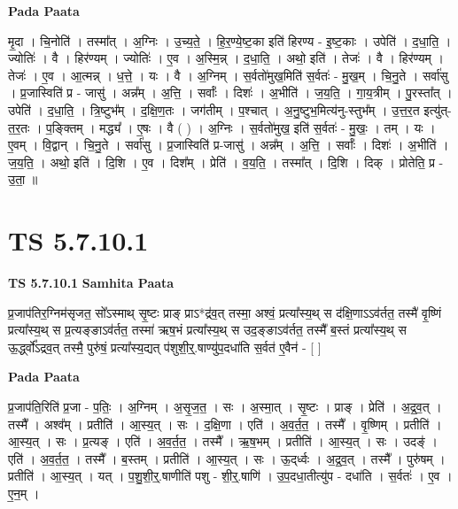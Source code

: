 \documentclass[17pt]{extarticle}
\begin{document}
\textbf{Pada Paata} \newline

मृ॒दा । चि॒नोति॑ । तस्मा᳚त् । अ॒ग्निः । उ॒च्य॒ते॒ । हि॒र॒ण्ये॒ष्ट॒का इति॑ हिरण्य - इ॒ष्ट॒काः । उपेति॑ । द॒धा॒ति॒ । ज्योतिः॑ । वै । हिर॑ण्यम् । ज्योतिः॑ । ए॒व । अ॒स्मि॒न्न् । द॒धा॒ति॒ । अथो॒ इति॑ । तेजः॑ । वै । हिर॑ण्यम् । तेजः॑ । ए॒व । आ॒त्मन्न् । ध॒त्ते॒ । यः । वै । अ॒ग्निम् । स॒र्वतो॑मुख॒मिति॑ स॒र्वतः॑ - मु॒ख॒म् । चि॒नु॒ते । सर्वा॑सु । प्र॒जास्विति॑ प्र - जासु॑ । अन्न᳚म् । अ॒त्ति॒ । सर्वाः᳚ । दिशः॑ । अ॒भीति॑ । ज॒य॒ति॒ । गा॒य॒त्रीम् । पु॒रस्ता᳚त् । उपेति॑ । द॒धा॒ति॒ । त्रि॒ष्टुभ᳚म् । द॒क्षि॒ण॒तः । जग॑तीम् । प॒श्चात् । अ॒नु॒ष्टुभ॒मित्य॑नु-स्तुभ᳚म् । उ॒त्त॒र॒त इत्यु॑त्-त॒र॒तः । प॒ङ्क्तिम् । मद्ध्य᳚ । ए॒षः । वै ( ) । अ॒ग्निः । स॒र्वतो॑मुख॒ इति॑ स॒र्वतः॑ - मु॒खः॒ । तम् । यः । ए॒वम् । वि॒द्वान् । चि॒नु॒ते । सर्वा॑सु । प्र॒जास्विति॑ प्र-जासु॑ । अन्न᳚म् । अ॒त्ति॒ । सर्वाः᳚ । दिशः॑ । अ॒भीति॑ । ज॒य॒ति॒ । अथो॒ इति॑ । दि॒शि । ए॒व । दिश᳚म् । प्रेति॑ । व॒य॒ति॒ । तस्मा᳚त् । दि॒शि । दिक् । प्रोतेति॒ प्र - उ॒ता॒ ॥  \newline





\section{ TS 5.7.10.1 }

\textbf{TS 5.7.10.1 } \newline
\textbf{Samhita Paata} \newline

प्र॒जाप॑तिर॒ग्निम॑सृजत॒ सो᳚ऽस्माथ् सृ॒ष्टः प्राङ् प्राऽ*द्र॑व॒त् तस्मा॒ अश्वं॒ प्रत्या᳚स्य॒थ् स द॑क्षि॒णाऽऽव॑र्तत॒ तस्मै॑ वृ॒ष्णिं प्रत्या᳚स्य॒थ् स प्र॒त्यङ्ङाऽव॑र्तत॒ तस्मा॑ ऋष॒भं प्रत्या᳚स्य॒थ् स उद॒ङ्ङाऽव॑र्तत॒ तस्मै᳚ ब॒स्तं प्रत्या᳚स्य॒थ् स ऊ॒र्द्ध्वो᳚ऽद्रव॒त् तस्मै॒ पुरु॑षं॒ प्रत्या᳚स्य॒द्यत् प॑शुशी॒र्॒.षाण्यु॑प॒दधा॑ति स॒र्वत॑ ए॒वैन॑ - [  ] \newline

\textbf{Pada Paata} \newline

प्र॒जाप॑ति॒रिति॑ प्र॒जा - प॒तिः॒ । अ॒ग्निम् । अ॒सृ॒ज॒त॒ । सः । अ॒स्मा॒त् । सृ॒ष्टः । प्राङ् । प्रेति॑ । अ॒द्र॒व॒त् । तस्मै᳚ । अश्व᳚म् । प्रतीति॑ । आ॒स्य॒त् । सः । द॒क्षि॒णा । एति॑ । अ॒व॒र्त॒त॒ । तस्मै᳚ । वृ॒ष्णिम् । प्रतीति॑ । आ॒स्य॒त् । सः । प्र॒त्यङ् । एति॑ । अ॒व॒र्त॒त॒ । तस्मै᳚ । ऋ॒ष॒भम् । प्रतीति॑ । आ॒स्य॒त् । सः । उदङ्॑ । एति॑ । अ॒व॒र्त॒त॒ । तस्मै᳚ । ब॒स्तम् । प्रतीति॑ । आ॒स्य॒त् । सः । ऊ॒द्‌र्ध्वः । अ॒द्र॒व॒त् । तस्मै᳚ । पुरु॑षम् । प्रतीति॑ । आ॒स्य॒त् । यत् । प॒शु॒शी॒र्॒.षाणीति॑ पशु - शी॒र्॒.षाणि॑ । उ॒प॒दधा॒तीत्यु॑प - दधा॑ति । स॒र्वतः॑ । ए॒व । ए॒न॒म् ।  \newline
\end{document}
